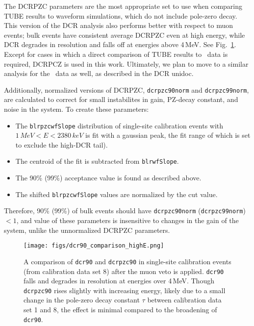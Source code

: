 \documentclass[groupedaddress,rmp,amsmath,amssymb,bibnotes,altaffilletter,twocolumn]{revtex4-1}
\begin{document}
The DCRPZC parameters are the most appropriate set to use when comparing TUBE results to waveform simulations, which do not include pole-zero decay. This version of the DCR analysis also performs better with respect to muon events; bulk events have consistent average DCRPZC even at high energy, while DCR degrades in resolution and falls off at energies above 4\,MeV. See Fig.~\ref{fig:dcr_dcrpzc_comparison}. Except for cases in which a direct comparison of TUBE results to \MJ\ data is required, DCRPCZ is used in this work. Ultimately, we plan to move to a similar analysis for the \MJ\ data as well, as described in the DCR unidoc. 

Additionally, normalized versions of DCRPZC, {\tt dcrpzc90norm} and {\tt dcrpzc99norm}, are calculated to correct for small instabilites in gain, PZ-decay constant, and noise in the system. To create these parameters:
\begin{itemize}
\item The {\tt blrpzcwfSlope} distribution of single-site calibration events with $1\,MeV< E < 2380\,keV$ is fit with a gaussian peak, the fit range of which is set to exclude the high-DCR tail). 
\item The centroid of the fit is subtracted from {\tt blrwfSlope}.
\item The 90\% (99\%) acceptance value is found as described above.
\item The shifted {\tt blrpzcwfSlope} values are normalized by the cut value.
\end{itemize}

Therefore, 90\% (99\%) of bulk events should have {\tt dcrpzc90norm} ({\tt dcrpzc99norm}) $< 1$, and value of these parameters is insensitive to changes in the gain of the system, unlike the unnormalized DCRPZC parameters.  

\begin{figure}[]
 \centering
 \texttt{[image: figs/dcr90\_comparison\_highE.png]}
 \caption{A comparison of {\tt dcr90} and {\tt dcrpzc90} in single-site calibration events (from calibration data set 8) after the muon veto is applied. {\tt dcr90} falls and degrades in resolution at energies over 4\,MeV. Though {\tt dcrpzc90} rises slightly with increasing energy, likely due to a small change in the pole-zero decay constant $\tau$ between calibration data set 1 and 8, the effect is minimal compared to the broadening of {\tt dcr90}.} 
 \label{fig:dcr_dcrpzc_comparison}
\end{figure}
\end{document}
